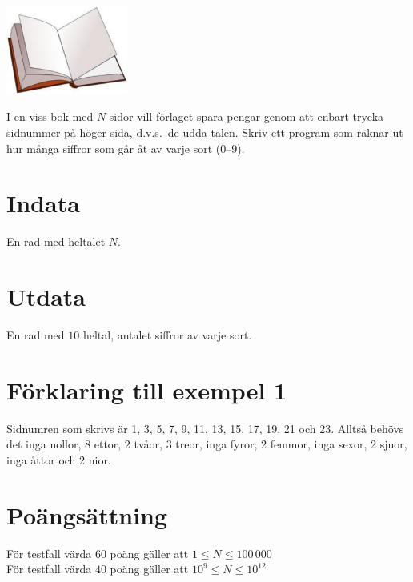 
\begin{center}
\includegraphics[width=0.3\textwidth]{bokbild.pdf}
\end{center}
 
I en viss bok med $N$ sidor vill förlaget spara pengar genom att enbart trycka
sidnummer på höger sida, d.v.s.\ de udda talen. Skriv ett program som
räknar ut hur många siffror som går åt av varje sort (0--9).

\section*{Indata}
En rad med heltalet $N$.

\section*{Utdata}
En rad med $10$ heltal, antalet siffror av varje sort.

\section*{Förklaring till exempel 1}

Sidnumren som skrivs är 1, 3, 5, 7, 9, 11, 13, 15,
17, 19, 21 och 23. Alltså behövs det inga nollor, 8 ettor, 2 tvåor, 3
treor, inga fyror, 2 femmor, inga sexor, 2 sjuor, inga åttor och 2 nior.

\section*{Poängsättning}
För testfall värda $60$ poäng gäller att $1 \le N \le 100\,000$ \\
För testfall värda $40$ poäng gäller att $10^{9} \le N \le 10^{12}$ \\
